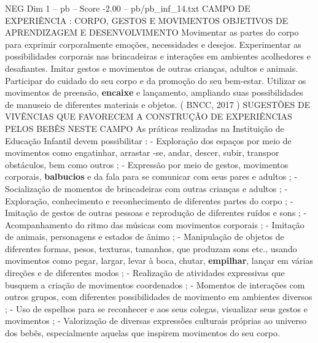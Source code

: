 \begin{textsample}{NEG Dim 1 – pb – Score -2.00 – pb/pb\_inf\_14.txt}  \label{ex:f1_neg_142}
CAMPO DE EXPERIÊNCIA : CORPO, GESTOS E MOVIMENTOS OBJETIVOS DE APRENDIZAGEM E DESENVOLVIMENTO Movimentar as partes do corpo para exprimir corporalmente emoções, necessidades e desejos.
Experimentar as possibilidades corporais nas brincadeiras e interações em ambientes acolhedores e desafiantes.
Imitar gestos e movimentos de outras crianças, adultos e animais.
Participar do cuidado do seu corpo e da promoção do seu bem-estar.
Utilizar os movimentos de preensão, \textbf{encaixe} e lançamento, ampliando suas possibilidades de manuseio de diferentes materiais e objetos. ( BNCC, 2017 ) SUGESTÕES DE VIVÊNCIAS QUE FAVORECEM A CONSTRUÇÃO DE EXPERIÊNCIAS PELOS BEBÊS NESTE CAMPO As práticas realizadas na Instituição de Educação Infantil devem possibilitar : - Exploração dos espaços por meio de movimentos como engatinhar, arrastar -se, andar, descer, subir, transpor obstáculos, bem como outros ; - Expressão por meio de gestos, movimentos corporais, \textbf{balbucios} e da fala para se comunicar com seus pares e adultos ; - Socialização de momentos de brincadeiras com outras crianças e adultos ; - Exploração, conhecimento e reconhecimento de diferentes partes do corpo ; - Imitação de gestos de outras pessoas e reprodução de diferentes ruídos e sons ; - Acompanhamento do ritmo das músicas com movimentos corporais ; - Imitação de animais, personagens e estados de ânimo ; - Manipulação de objetos de diferentes formas, pesos, texturas, tamanhos, que produzam sons etc., usando movimentos como pegar, largar, levar à boca, chutar, \textbf{empilhar}, lançar em várias direções e de diferentes modos ; - Realização de atividades expressivas que busquem a criação de movimentos coordenados ; - Momentos de interações com outros grupos, com diferentes possibilidades de movimento em ambientes diversos ; - Uso de espelhos para se reconhecer e aos seus colegas, visualizar seus gestos e movimentos ; - Valorização de diversas expressões culturais próprias ao universo dos bebês, especialmente aquelas que inspirem movimentos do seu corpo.

\end{textsample}
